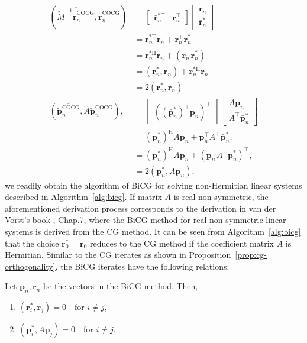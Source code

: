 \[\begin{aligned}
(\overline{\widetilde M^{-1}\widetilde{\bm r}_n^{\mathrm{COCG}}},\widetilde{\bm r}_n^{\mathrm{COCG}})&=\begin{bmatrix}\bar{\bm r}_n^{*\top}&\bm r_n^{\top}\end{bmatrix}\begin{bmatrix}\bm r_n\\\bar{\bm r}_n^{*}\end{bmatrix}\\
&=\bar{\bm r}_n^{*\top}\bm r_n+\bm r_n^{\top}\bar{\bm r}_n^{*}\\
&=\bm r_n^{*\mathrm H}\bm r_n+(\bm r_n^{\top}\bar{\bm r}_n^{*})^{\top}\\
&=(\bm r_n^{*},\bm r_n)+\bm r_n^{*\mathrm H}\bm r_n\\
&=2(\bm r_n^{*},\bm r_n)\\
(\overline{\widetilde{\bm p}_n^{\mathrm{COCG}}},\widetilde A\widetilde{\bm p}_n^{\mathrm{COCG}}),&=\begin{bmatrix}((\bar{\bm p}_n^{*})^{\top}\bm p_n)^{\top}\end{bmatrix}\begin{bmatrix}A\bm p_n\\A^{\top}\bar{\bm p}_n^{*}\end{bmatrix}\\
&=(\bm p_n^{*})^{\mathrm H}A\bm p_n+\bm p_n^{\top}A^{\top}\bar{\bm p}_n^{*},\\
&=(\bm p_n^{*})^{\mathrm H}A\bm p_n+(\bm p_n^{\top}A^{\top}\bar{\bm p}_n^{*})^{\top},\\
&=2(\bm p_n^{*},A\bm p_n),
\end{aligned}\]
{we readily obtain the algorithm of BiCG for solving non-Hermitian linear systems described in Algorithm\ \ref{alg:bicg}. If matrix $A$ is real non-symmetric, the aforementioned derivation process corresponds to the derivation in van der Vorst's book , Chap.7, where the BiCG method for real non-symmetric linear systems is derived from the CG method.}
{It can be seen from Algorithm\ \ref{alg:bicg} that the choice $\bm r_0^{*}=\bm r_0$ reduces to the CG method if the coefficient matrix $A$ is Hermitian.}
{Similar to the CG iterates as shown in Proposition\ \ref{prop:cg-orthogonality}, the BiCG iterates have the following relations:}
\par{}
\begin{Proposition}\label{prop:bicg-biorthogonality}
{Let $\bm p_n,\bm r_n$ be the vectors in the BiCG method. Then,}
\begin{enumerate}\item $(\bm r_i^{*},\bm r_j)=0\quad\text{for }i\ne j$,\item $(\bm p_i^{*},A\bm p_j)=0\quad\text{for }i\ne j$.\end{enumerate}
\end{Proposition}
